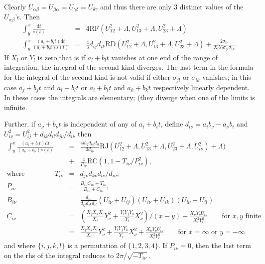 Clearly $U_{\alpha\beta}=U_{\beta\alpha}=U_{\gamma\delta}=U_{\delta\gamma}$ and thus there
are only 3 distinct values of the $U_{\alpha\beta}$'s. Then
\begin{eqnarray*}
  \int_y^x \frac{\mathrm{d}t}{s(t)} &=& 4\mathrm{RF}(U_{12}^2+\Lambda,
  U_{13}^2+\Lambda, U_{23}^2+\Lambda)\\
\int_y^x\frac{(a_i+b_it)\mathrm{d}t}{(a_l+b_lt)s(t)} &=& \frac{4}{3}d_{ij}d_{ik}
\mathrm{RD}(U_{12}^2+\Lambda, U_{13}^2+\Lambda, U_{23}^2+\Lambda) +
\frac{2\sigma_{il}}{X_lY_l\sigma_{jl}\sigma_{ik}}.
\end{eqnarray*}
If $X_l$ or $Y_l$ is zero,that is if $a_l+b_lt$ vanishes at one end of the range
of integration, the integral of the second kind diverges. The last term in the
formula for the integral of the second kind is not valid if either $\sigma_{jl}$
or $\sigma_{ik}$ vanishes; in this case $a_j+b_jt$ and $a_l+b_lt$ or $a_i+b_it$
and $a_k+b_kt$ respectively linearly dependent.  In these cases the integrals
are elementary; (they diverge when one of the limits is infinite.

Further, if $a_\nu+b_\nu t$ is independent of any of $a_i+b_i t$, define
 $d_{i\nu}=a_ib_\nu-a_\nu b_i$ and $U_{i\nu}^2=U_{ij}^2+d_{ik}d_{il}d_{j\nu}/d_{i\nu}$ 
then
\begin{eqnarray*}
\int_y^x\frac{(a_i+b_it)\mathrm{d}t}{(a_\nu+b_\nu)s(t)} &=& \frac{4d_{ij}d_{ik}
d_{il}}{3d_{i\nu}}\mathrm{RJ}(U_{12}^2 +\Lambda, U_{13}^2 +\Lambda, U_{23}^2+\Lambda,U_{i\nu}^2) +\Lambda)\\
&+&\frac{4}{P_{i\nu}}\mathrm{RC}(1, 1-T_{i\nu}/P_{i\nu}^2),\\
\mbox{where }\qquad\qquad
T_{i\nu}&=& d_{j\nu}d_{k\nu}d_{l\nu}/d_{i\nu},\\
P_{i\nu}&=& \frac{B_{i\nu}C_{i\nu}+T_{i\nu}}{B_{i\nu}+C_{i\nu}},\\
B_{i\nu} &=& \frac{d_{i\nu}}{d_{ij}d_{ik}d_{il}}(U_{i\nu}+U_{ij})(U_{i\nu}+U_{ik})(U_{i\nu}+U_{il})\\
C_{i\nu} &=& \left(\frac{X_jX_kX_l}{X_i}Y_\nu^2+\frac{Y_iY_jY_k}{Y_i}X_\nu^2\right)/(x-y)+\frac{X_\nu Y_\nu U_{i\nu}}{X_i^2Y_i^2}\qquad \mbox{for }x,y\mbox{ finite}\\
&=& \frac{X_jX_kX_l}{X_i}Y_\nu^2+\frac{Y_iY_jY_k}{Y_i}X_\nu^2+\frac{X_\nu Y_\nu U_{i\nu}}{X_i^2Y_i^2} \qquad \mbox{for } x = \infty \mbox{ or } y = -\infty
\end{eqnarray*}
and where $\{i,j,k,l\}$ is a permutation of $\{1,2,3,4\}$. If $P_{i\nu} =0$, then
the last term on the rhs of the integral reduces to $2\pi/\sqrt{-T_{i\nu}}$.

